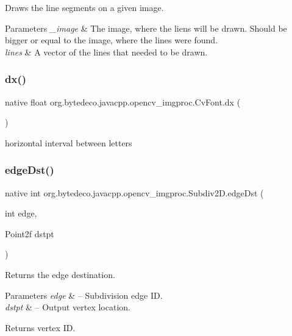 Draws the line segments on a given image. 


\begin{DoxyParams}{Parameters}
{\em \+\_\+image} & The image, where the liens will be drawn. Should be bigger or equal to the image, where the lines were found. \\
\hline
{\em lines} & A vector of the lines that needed to be drawn. \\
\hline
\end{DoxyParams}
\mbox{\label{group__imgproc_ga294de5433e3cdf5192b9c2fd48520538}} 
\subsubsection{\texorpdfstring{dx()}{dx()}}
{\footnotesize\ttfamily native float org.\+bytedeco.\+javacpp.\+opencv\+\_\+imgproc.\+Cv\+Font.\+dx (\begin{DoxyParamCaption}{ }\end{DoxyParamCaption})}

horizontal interval between letters \mbox{\label{group__imgproc_gad2814006051bf55fa95077d3578347fb}} 
\subsubsection{\texorpdfstring{edge\+Dst()}{edgeDst()}}
{\footnotesize\ttfamily native int org.\+bytedeco.\+javacpp.\+opencv\+\_\+imgproc.\+Subdiv2\+D.\+edge\+Dst (\begin{DoxyParamCaption}\item[{int}]{edge,  }\item[{Point2f}]{dstpt }\end{DoxyParamCaption})}



Returns the edge destination. 


\begin{DoxyParams}{Parameters}
{\em edge} & – Subdivision edge ID. \\
\hline
{\em dstpt} & – Output vertex location. \\
\hline
\end{DoxyParams}
\begin{DoxyReturn}{Returns}
vertex ID. 
\end{DoxyReturn}
\mbox{\label{group__imgproc_gac70cf2d7562d68ab618249b422182e99}} 
